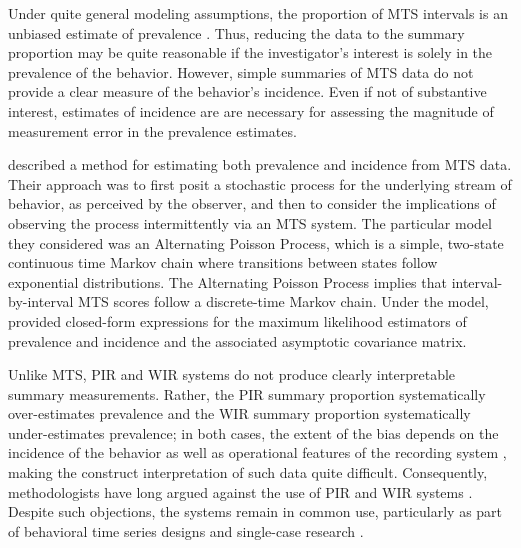 \documentclass[man, noextraspace, floatsintext]{apa6}\usepackage[]{graphicx}\usepackage[]{color}
\begin{document}
Under quite general modeling assumptions, the proportion of MTS intervals is an unbiased estimate of prevalence \citep{Rogosa1991statistical}. 
Thus, reducing the data to the summary proportion may be quite reasonable if the investigator's interest is solely in the prevalence of the behavior. 
However, simple summaries of MTS data do not provide a clear measure of the behavior's incidence. 
Even if not of substantive interest, estimates of incidence are  are necessary for assessing the magnitude of measurement error in the prevalence estimates. 

\citet{Brown1977estimation} described a method for estimating both prevalence and incidence from MTS data. 
Their approach was to first posit a stochastic process for the underlying stream of behavior, as perceived by the observer, and then to consider the implications of observing the process intermittently via an MTS system. 
The particular model they considered was an Alternating Poisson Process, which is a simple, two-state continuous time Markov chain where transitions between states follow exponential distributions. 
The Alternating Poisson Process implies that interval-by-interval MTS scores follow a discrete-time Markov chain. 
Under the model, \citet[see also \citealp{Griffin1983parametric}]{Brown1977estimation} provided closed-form expressions for the maximum likelihood estimators of prevalence and incidence and the associated asymptotic covariance matrix.

Unlike MTS, PIR and WIR systems do not produce clearly interpretable summary measurements. 
Rather, the PIR summary proportion systematically over-estimates prevalence and the WIR summary proportion systematically under-estimates prevalence; in both cases, the extent of the bias depends on the incidence of the behavior as well as operational features of the recording system \citep{Kraemer1979one, Rogosa1991statistical}, making the construct interpretation of such data quite difficult. 
Consequently, methodologists have long argued against the use of PIR and WIR systems \citep[cf.]{Altmann1974observational, Mann1991time, Lane2014using}. 
Despite such objections, the systems remain in common use, particularly as part of behavioral time series designs and single-case research \citep{Rapp2007interval, Mudford2009continuous, Lane2014using}. 
\end{document}
